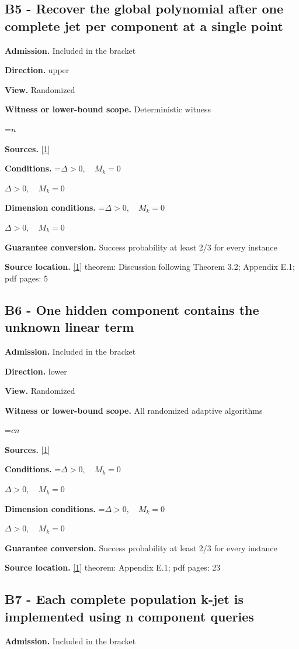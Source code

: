 \documentclass[10pt,a4paper]{article}
\newcommand{\AtlasMath}[1]{\par\begingroup\centering\setbox0=\hbox{$\displaystyle #1$}\ifdim\wd0>1.4\linewidth\typeout{ATLAS WIDE FORMULA: \the\wd0}\fi\ifdim\wd0>\linewidth\resizebox{\linewidth}{!}{\box0}\else\box0\fi\par\endgroup}
\newcommand{\AtlasInlineMath}[1]{\begingroup\setbox0=\hbox{$#1$}\ifdim\wd0>.4\linewidth\endgroup\AtlasMath{#1}\else\endgroup$#1$\fi}
\begin{document}
\subsection{B5 - Recover the global polynomial after one complete jet per component at a single point}
\textbf{Admission.} Included in the bracket

\textbf{Direction.} upper

\textbf{View.} Randomized

\textbf{Witness or lower-bound scope.} Deterministic witness

\AtlasMath{n}
\textbf{Sources.} \href{https://arxiv.org/pdf/2609.28202v2}{[1]}

\textbf{Conditions.} \AtlasInlineMath{\Delta>0,\quad M_k=0}

\textbf{Dimension conditions.} \AtlasInlineMath{\Delta>0,\quad M_k=0}

\textbf{Guarantee conversion.} Success probability at least 2/3 for every instance

\textbf{Source location.} \href{https://arxiv.org/pdf/2609.28202v2}{[1]} theorem: Discussion following Theorem 3.2; Appendix E.1; pdf pages: 5

\subsection{B6 - One hidden component contains the unknown linear term}
\textbf{Admission.} Included in the bracket

\textbf{Direction.} lower

\textbf{View.} Randomized

\textbf{Witness or lower-bound scope.} All randomized adaptive algorithms

\AtlasMath{cn}
\textbf{Sources.} \href{https://arxiv.org/pdf/2609.28202v2}{[1]}

\textbf{Conditions.} \AtlasInlineMath{\Delta>0,\quad M_k=0}

\textbf{Dimension conditions.} \AtlasInlineMath{\Delta>0,\quad M_k=0}

\textbf{Guarantee conversion.} Success probability at least 2/3 for every instance

\textbf{Source location.} \href{https://arxiv.org/pdf/2609.28202v2}{[1]} theorem: Appendix E.1; pdf pages: 23

\subsection{B7 - Each complete population k-jet is implemented using n component queries}
\textbf{Admission.} Included in the bracket
\end{document}
